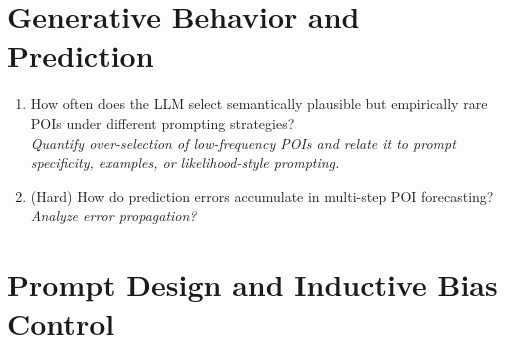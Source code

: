 \documentclass{article}
\begin{document}
\section{Generative Behavior and Prediction}

\begin{enumerate}
    \item How often does the LLM select semantically plausible but empirically rare POIs under different prompting strategies?\\
    \textit{Quantify over-selection of low-frequency POIs and relate it to prompt specificity, examples, or likelihood-style prompting.}

    \item  {\color{blue}(Hard)} How do prediction errors accumulate in multi-step POI forecasting?\\
    \textit{Analyze error propagation?}
\end{enumerate}

\section{Prompt Design and Inductive Bias Control}
\end{document}
